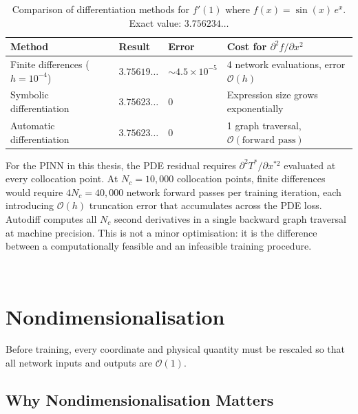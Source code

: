 \documentclass[12pt, a4paper]{article}
\begin{document}
\begin{table}[H]
\centering
\caption{Comparison of differentiation methods for $f'(1)$ where
         $f(x)=\sin(x)\,e^x$. Exact value: $3.756234\ldots$}
\label{tab:diff_comparison}
\begin{tabularx}{\textwidth}{lXXX}
\toprule
\textbf{Method} & \textbf{Result} & \textbf{Error} & \textbf{Cost for $\partial^2 f/\partial x^2$} \\
\midrule
Finite differences ($h=10^{-4}$)
    & $3.75619\ldots$
    & $\sim 4.5 \times 10^{-5}$
    & 4 network evaluations, error $\mathcal{O}(h)$ \\
Symbolic differentiation
    & $3.75623\ldots$
    & $0$
    & Expression size grows exponentially \\
Automatic differentiation
    & $3.75623\ldots$
    & $0$
    & 1 graph traversal, $\mathcal{O}(\text{forward pass})$ \\
\bottomrule
\end{tabularx}
\end{table}

For the PINN in this thesis, the PDE residual requires $\partial^2 T^*/\partial
x^{*2}$ evaluated at every collocation point. At $N_c = 10{,}000$ collocation
points, finite differences would require $4 N_c = 40{,}000$ network forward passes
per training iteration, each introducing $\mathcal{O}(h)$ truncation error that
accumulates across the PDE loss. Autodiff computes all $N_c$ second derivatives in
a single backward graph traversal at machine precision. This is not a minor
optimisation: it is the difference between a computationally feasible and an
infeasible training procedure.






\
\section{Nondimensionalisation}
\label{sec:nondim}

Before training, every coordinate and physical quantity must be rescaled so that
all network inputs and outputs are $\mathcal{O}(1)$.

\subsection{Why Nondimensionalisation Matters}
\label{sec:nondim_why}
\end{document}

